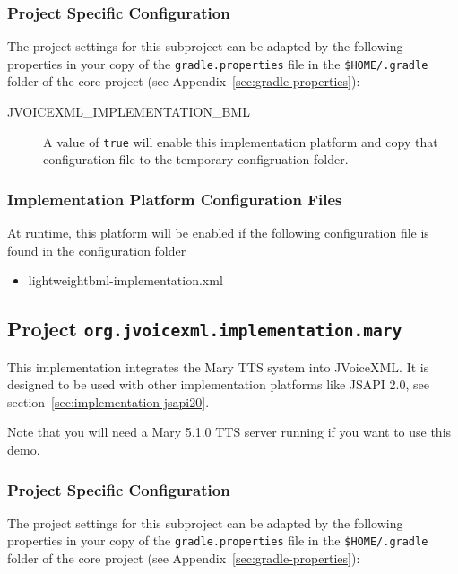 \documentclass[11pt,a4paper]{article}
\begin{document}
\subsubsection{Project Specific Configuration}

The project settings for this subproject can be adapted by the following 
properties in your copy of the \texttt{gradle.properties} file in the
\texttt{\${HOME}/.gradle} folder of the core project (see 
Appendix~\ref{sec:gradle-properties}):

\begin{description}
\item[JVOICEXML\_IMPLEMENTATION\_BML] A value of \texttt{true} will enable this implementation
platform and copy that configuration file to the temporary configruation folder.
\end{description}

\subsubsection{Implementation Platform Configuration Files}

At runtime, this platform will be enabled if the following configuration file is found in the configuration
folder
\begin{itemize}
\item lightweightbml-implementation.xml
\end{itemize}


\subsection{Project \texttt{org.jvoicexml.implementation.mary}}

This implementation integrates the Mary TTS system into JVoiceXML. It is
designed to be used with other implementation platforms like JSAPI 2.0, see
section~\ref{sec:implementation-jsapi20}.

Note that you will need a Mary 5.1.0  TTS server running if you want to use this
demo. 

\subsubsection{Project Specific Configuration}

The project settings for this subproject can be adapted by the following 
properties in your copy of the \texttt{gradle.properties} file in the
\texttt{\${HOME}/.gradle} folder of the core project (see 
Appendix~\ref{sec:gradle-properties}):
\end{document}
